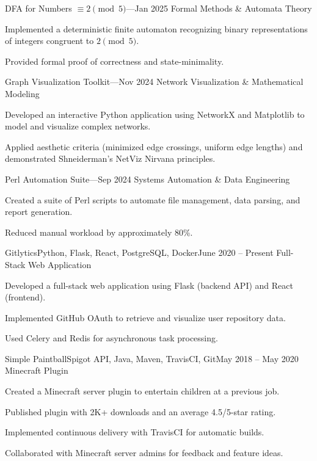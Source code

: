 \begin{resume-itemize}
  {DFA for Numbers $\equiv 2 \pmod{5}$}{---}{Jan 2025}
  {Formal Methods \& Automata Theory}
    \item Implemented a deterministic finite automaton recognizing binary representations of integers congruent to $2 \pmod{5}$.
    \item Provided formal proof of correctness and state-minimality.
\end{resume-itemize}
\begin{resume-itemize}
  {Graph Visualization Toolkit}{---}{Nov 2024}
  {Network Visualization \& Mathematical Modeling}
    \item Developed an interactive Python application using NetworkX and Matplotlib to model and visualize complex networks.
    \item Applied aesthetic criteria (minimized edge crossings, uniform edge lengths) and demonstrated Shneiderman's NetViz Nirvana principles.
\end{resume-itemize}
\begin{resume-itemize}
  {Perl Automation Suite}{---}{Sep 2024}
  {Systems Automation \& Data Engineering}
    \item Created a suite of Perl scripts to automate file management, data parsing, and report generation.
    \item Reduced manual workload by approximately 80\%.
\end{resume-itemize}
\begin{resume-itemize}
  {Gitlytics}{Python, Flask, React, PostgreSQL, Docker}{June 2020 -- Present}
  {Full-Stack Web Application}
    \item Developed a full-stack web application using Flask (backend API) and React (frontend).
    \item Implemented GitHub OAuth to retrieve and visualize user repository data.
    \item Used Celery and Redis for asynchronous task processing.
\end{resume-itemize}
\begin{resume-itemize}
  {Simple Paintball}{Spigot API, Java, Maven, TravisCI, Git}{May 2018 -- May 2020}
  {Minecraft Plugin}
    \item Created a Minecraft server plugin to entertain children at a previous job.
    \item Published plugin with 2K+ downloads and an average 4.5/5-star rating.
    \item Implemented continuous delivery with TravisCI for automatic builds.
    \item Collaborated with Minecraft server admins for feedback and feature ideas.
\end{resume-itemize}


